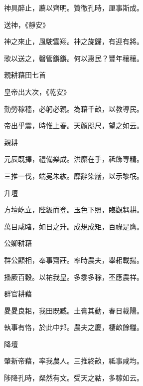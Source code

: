 \begin{pinyinscope}
 神具醉止，薦以齊明。贊徹孔時，厘事斯成。



 送神，《靜安》



 神之來止，風駛雲翔。神之旋歸，有迎有將。



 歌以送之，磬管鏘鏘。何以惠民？豐年穰穰。



 親耕藉田七首



 皇帝出大次，《乾安》



 勤勞稼穡，必躬必親。為藉千畝，以教導民。



 帝出乎震，時惟上春。天顏咫尺，望之如云。



 親耕



 元辰既擇，禮備樂成。洪縻在手，祗飾專精。



 三推一伐，端冕朱紘。靡辭染屨，以示黎氓。



 升壇



 方壇屹立，陛級而登。玉色下照，臨觀耦耕。



 萬目咸睹，如日之升。成規成矩，百祿是膺。



 公卿耕藉



 群公顯相，奉事齋莊。率時農夫，舉耜載揚。



 播厥百穀。以祐我皇。多黍多稌，丕應農祥。



 群官耕藉



 畟畟良耜，我田既臧。土膏其動，春日載陽。



 執事有恪，於此中邦。農夫之慶，棲畝餘糧。



 降壇



 肇新帝藉，率我農人。三推終畝，祗事咸均。



 陟降孔時，粲然有文。受天之祜，多稼如云。




\end{pinyinscope}
